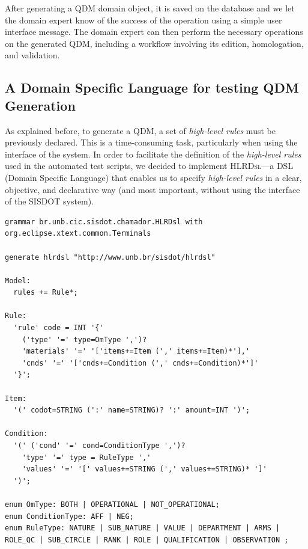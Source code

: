 \documentclass[AMA,STIX1COL,hidelinks]{WileyNJD-v2}
\newcommand{\callers}{\emph{high-level rules}\xspace}
\newcommand{\hlrdsl}{\textsc{HLRDsl}\xspace}
\begin{document}
After generating a QDM domain object, it is saved on the database and we let the domain expert know of the success of the operation using a simple user interface message. The domain expert can then perform the necessary operations on the generated QDM, including a workflow involving  its edition, homologation, and validation.  





\subsection{A Domain Specific Language for testing QDM Generation}

As explained before, to generate a QDM, a set of \callers must be previously declared. This is a time-consuming task, particularly when using the interface of the system. In order to facilitate the definition of the \callers used in the automated test scripts, we decided to implement \hlrdsl---a DSL (Domain Specific Language) that enables us to specify \callers in a clear, objective, and declarative way (and most important, without using the interface of the SISDOT system). 



\begin{lstlisting}[frame=single, float=*t, language=Xtext, caption={\it Xtext grammar defining the DSL structure}, label={code:gramatica}]
grammar br.unb.cic.sisdot.chamador.HLRDsl with org.eclipse.xtext.common.Terminals
        
generate hlrdsl "http://www.unb.br/sisdot/hlrdsl"

Model:
  rules += Rule*;

Rule:
  'rule' code = INT '{'
    ('type' '=' type=OmType ',')?
    'materials' '=' '['items+=Item (',' items+=Item)*'],'
    'cnds' '=' '['cnds+=Condition (',' cnds+=Condition)*']'
  '}';

Item: 
  '(' codot=STRING (':' name=STRING)? ':' amount=INT ')';

Condition:
  '(' ('cond' '=' cond=ConditionType ',')?
    'type' '=' type = RuleType ','
    'values' '=' '[' values+=STRING (',' values+=STRING)* ']'
  ')';

enum OmType: BOTH | OPERATIONAL | NOT_OPERATIONAL;
enum ConditionType: AFF | NEG;
enum RuleType: NATURE | SUB_NATURE | VALUE | DEPARTMENT | ARMS | ROLE_QC | SUB_CIRCLE | RANK | ROLE | QUALIFICATION | OBSERVATION ;
\end{lstlisting}
\end{document}
